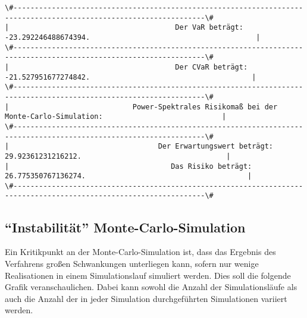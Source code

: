 \documentclass[paper=landscape]{scrartcl}
\begin{document}
    \begin{Verbatim}[commandchars=\\\{\}]
\#-------------------------------------------------------------------------------------------------------------------\#
|                                       Der VaR beträgt: -23.292246488674394.                                       | 
\#-------------------------------------------------------------------------------------------------------------------\#
|                                       Der CVaR beträgt: -21.527951677274842.                                      | 
\#-------------------------------------------------------------------------------------------------------------------\#
|                             Power-Spektrales Risikomaß bei der Monte-Carlo-Simulation:                            | 
\#-------------------------------------------------------------------------------------------------------------------\#
|                                   Der Erwartungswert beträgt: 29.92361231216212.                                  | 
|                                      Das Risiko beträgt: 26.775350767136274.                                      | 
\#-------------------------------------------------------------------------------------------------------------------\#

    \end{Verbatim}

    \hypertarget{instabilituxe4t-monte-carlo-simulation}{%
\subsection{``Instabilität''
Monte-Carlo-Simulation}\label{instabilituxe4t-monte-carlo-simulation}}

Ein Kritikpunkt an der Monte-Carlo-Simulation ist, dass das Ergebnis des
Verfahrens großen Schwankungen unterliegen kann, sofern nur wenige
Realisationen in einem Simulationslauf simuliert werden. Dies soll die
folgende Grafik veranschaulichen. Dabei kann sowohl die Anzahl der
Simulationsläufe als auch die Anzahl der in jeder Simulation
durchgeführten Simulationen variiert werden.
\end{document}
